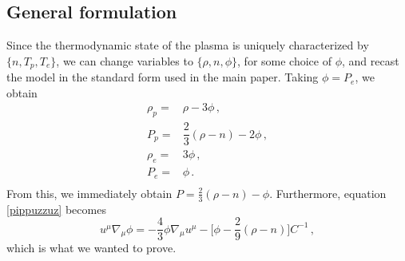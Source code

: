 \documentclass[aps,prl,noshowpacs,noshowkeys,floatfix,superscriptaddress,singlecolum,nofootinbib]{revtex4-2}
\theoremstyle{definition}
\theoremstyle{theorem}
\begin{document}
\subsection*{General formulation}

Since the thermodynamic state of the plasma is uniquely characterized by $\{n,T_p,T_e\}$, we can change variables to $\{\rho,n,\phi\}$, for some choice of $\phi$, and recast the model in the standard form used in the main paper. Taking $\phi=P_e$, we obtain
\begin{equation}
    \begin{split}
\rho_p ={}& \rho-3\phi \, , \\
P_p ={}& \dfrac{2}{3} (\rho-n)-2\phi \, , \\
\rho_e ={}& 3\phi \, , \\
P_e ={}& \phi \, . \\
    \end{split}
\end{equation}
From this, we immediately obtain $P =\frac{2}{3}(\rho-n)-\phi$. Furthermore, equation \eqref{pippuzzuz} becomes
\begin{equation}
    u^\mu \nabla_\mu \phi = -\dfrac{4}{3} \phi \nabla_\mu u^\mu -\bigg[\phi -\dfrac{2}{9}(\rho-n) \bigg]C^{-1} \, ,
\end{equation}
which is what we wanted to prove.



\newpage
%



\label{lastpage}
\end{document}
